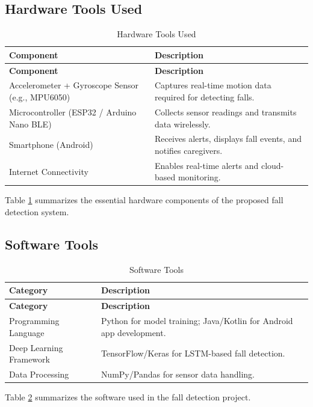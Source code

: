 \documentclass[a4paper, 12pt]{report}
\begin{document}
\subsection{Hardware Tools Used}
\begin{longtable}{|p{}|p{}|}
    \caption{Hardware Tools Used}\label{tab:hardware_tools} \\
    
    \hline
    \textbf{Component} & \textbf{Description} \\
    \hline
    \endfirsthead
    
    \hline
    \textbf{Component} & \textbf{Description} \\
    \hline
    \endhead
    
    \hline
    \endfoot
    
    \hline
    \endlastfoot
    
    Accelerometer + Gyroscope Sensor (e.g., MPU6050) & Captures real-time motion data required for detecting falls. \\
    \hline
    Microcontroller (ESP32 / Arduino Nano BLE) & Collects sensor readings and transmits data wirelessly. \\
    \hline
    Smartphone (Android) & Receives alerts, displays fall events, and notifies caregivers. \\
    \hline
    Internet Connectivity & Enables real-time alerts and cloud-based monitoring. \\
\end{longtable}
Table \ref{tab:hardware_tools} summarizes the essential hardware components of the proposed fall detection system.

\subsection{Software Tools}
\begin{longtable}{|p{}|p{}|}
    \caption{Software Tools}\label{tab:software_Tools} \\
    
    \hline
    \textbf{Category} & \textbf{Description} \\
    \hline
    \endfirsthead

    \hline
    \textbf{Category} & \textbf{Description} \\
    \hline
    \endhead

    \hline
    \endfoot

    \hline
    \endlastfoot

    Programming Language & Python for model training; Java/Kotlin for Android app development. \\
    \hline
    Deep Learning Framework & TensorFlow/Keras for LSTM-based fall detection. \\
    \hline
    Data Processing & NumPy/Pandas for sensor data handling. \\
\end{longtable}
Table \ref{tab:software_Tools} summarizes the software used in the fall detection project.
\end{document}
